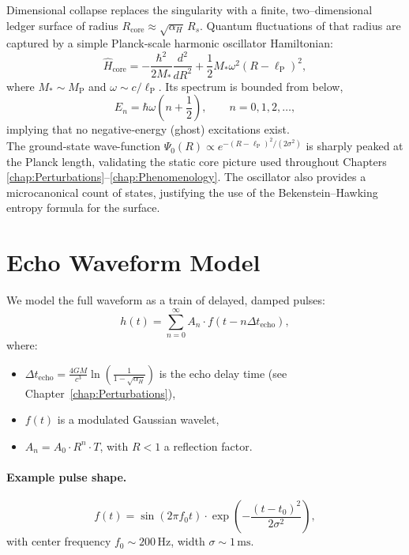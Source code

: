 \documentclass[a4paper, 12pt, oneside]{book}
\numberwithin{equation}{chapter}
\begin{document}
Dimensional collapse replaces the singularity with a finite, 
two--dimensional ledger surface of radius $R_{\mathrm{core}}\!\approx\!\sqrt{\alpha_H}\,R_s$.
Quantum fluctuations of that radius are captured by a simple
Planck‐scale harmonic oscillator Hamiltonian\cite{Hawking1975,Page1993}:
\[
  \hat H_{\mathrm{core}}
    = -\frac{\hbar^{2}}{2M_\ast}\frac{d^{2}}{dR^{2}}
      + \frac{1}{2}M_\ast\omega^{2}(R-\ell_{\mathrm P})^{2},
\]
where $M_\ast \!\sim\! M_{\mathrm P}$ and
$\omega \!\sim\! c/\ell_{\mathrm P}$.
Its spectrum is bounded from below,
\[
  E_n = \hbar\omega\!\left(n+\frac12\right), \qquad n=0,1,2,\dots ,
\]
implying that no negative‐energy (ghost) excitations exist.
\\ The ground‐state wave-function
\(
\Psi_0(R) \propto e^{-(R-\ell_{\mathrm P})^{2}/(2\sigma^2)}
\)
is sharply peaked at the Planck length, validating the static core
picture used throughout Chapters \ref{chap:Perturbations}–\ref{chap:Phenomenology}.
The oscillator also provides a microcanonical count of states,
justifying the use of the Bekenstein–Hawking entropy formula for the surface.
\bigskip

\section{Echo Waveform Model}
\label{sec:EchoWaveform}

We model the full waveform as a train of delayed, damped pulses:
\[
    h(t) = \sum_{n=0}^{\infty}
        A_n \cdot f(t - n\Delta t_{\text{echo}}),
\]
where:
\begin{itemize}
  \item \( \Delta t_{\text{echo}} = \frac{4GM}{c^3} \ln\left(\frac{1}{1 - \sqrt{\alpha_H}}\right) \)
  is the echo delay time (see Chapter~\ref{chap:Perturbations}),
  \item \( f(t) \) is a modulated Gaussian wavelet,
  \item \( A_n = A_0 \cdot R^n \cdot T \), with \( R < 1 \) a reflection factor.
\end{itemize}

\paragraph{Example pulse shape.}
\[
    f(t) = \sin(2\pi f_0 t) \cdot \exp\left(-\frac{(t - t_0)^2}{2\sigma^2}\right),
\]
with center frequency \( f_0 \sim 200\,\mathrm{Hz} \), width \( \sigma \sim 1\,\mathrm{ms} \).
\end{document}
